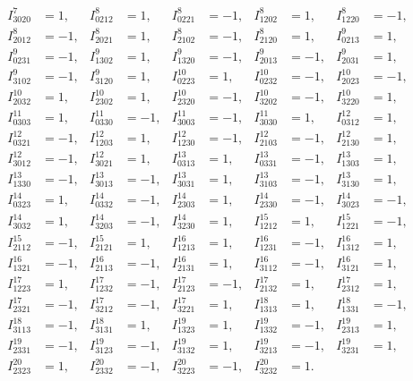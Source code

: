 \documentclass[a4paper,12pt, DIV=14, BCOR=5mm, twoside, headsepline]{scrbook}
\begin{document}
\begin{align}
\begin{alignedat}{5}
I^{7}_{3020} &= 1,   &  
I^{8}_{0212} &= 1,       &
I^{8}_{0221} &= -1,   &  
I^{8}_{1202} &= 1,   &  
I^{8}_{1220} &= -1,       \\
I^{8}_{2012} &= -1,   &  
I^{8}_{2021} &= 1,   &  
I^{8}_{2102} &= -1,       &
I^{8}_{2120} &= 1,   &  
I^{9}_{0213} &= 1,   \\  
I^{9}_{0231} &= -1,       &
I^{9}_{1302} &= 1,   &  
I^{9}_{1320} &= -1,   &  
I^{9}_{2013} &= -1,       &
I^{9}_{2031} &= 1,   \\  
I^{9}_{3102} &= -1,   &  
I^{9}_{3120} &= 1,       &
I^{10}_{0223} &= 1,   &  
I^{10}_{0232} &= -1,   &  
I^{10}_{2023} &= -1,       \\
I^{10}_{2032} &= 1,   &  
I^{10}_{2302} &= 1,   &  
I^{10}_{2320} &= -1,       &
I^{10}_{3202} &= -1,   &  
I^{10}_{3220} &= 1,   \\  
I^{11}_{0303} &= 1,       &
I^{11}_{0330} &= -1,   &  
I^{11}_{3003} &= -1,   &  
I^{11}_{3030} &= 1,       &
I^{12}_{0312} &= 1,   \\  
I^{12}_{0321} &= -1,   &  
I^{12}_{1203} &= 1,       &
I^{12}_{1230} &= -1,   &  
I^{12}_{2103} &= -1,   &  
I^{12}_{2130} &= 1,       \\
I^{12}_{3012} &= -1,   &  
I^{12}_{3021} &= 1,   &  
I^{13}_{0313} &= 1,       &
I^{13}_{0331} &= -1,   &  
I^{13}_{1303} &= 1,   \\  
I^{13}_{1330} &= -1,       &
I^{13}_{3013} &= -1,   &  
I^{13}_{3031} &= 1,   &  
I^{13}_{3103} &= -1,       &
I^{13}_{3130} &= 1,   \\  
I^{14}_{0323} &= 1,   &  
I^{14}_{0332} &= -1,       &
I^{14}_{2303} &= 1,   &  
I^{14}_{2330} &= -1,   &  
I^{14}_{3023} &= -1,       \\
I^{14}_{3032} &= 1,   &  
I^{14}_{3203} &= -1,   &  
I^{14}_{3230} &= 1,       &
I^{15}_{1212} &= 1,   &  
I^{15}_{1221} &= -1,   \\  
I^{15}_{2112} &= -1,       &
I^{15}_{2121} &= 1,   &  
I^{16}_{1213} &= 1,   &  
I^{16}_{1231} &= -1,       &
I^{16}_{1312} &= 1,   \\  
I^{16}_{1321} &= -1,   &  
I^{16}_{2113} &= -1,       &
I^{16}_{2131} &= 1,   &  
I^{16}_{3112} &= -1,   &  
I^{16}_{3121} &= 1,       \\
I^{17}_{1223} &= 1,   &  
I^{17}_{1232} &= -1,   &  
I^{17}_{2123} &= -1,       &
I^{17}_{2132} &= 1,   &  
I^{17}_{2312} &= 1,   \\  
I^{17}_{2321} &= -1,       &
I^{17}_{3212} &= -1,   &  
I^{17}_{3221} &= 1,   &  
I^{18}_{1313} &= 1,       &
I^{18}_{1331} &= -1,   \\  
I^{18}_{3113} &= -1,   &  
I^{18}_{3131} &= 1,       &
I^{19}_{1323} &= 1,   &  
I^{19}_{1332} &= -1,   &  
I^{19}_{2313} &= 1,       \\
I^{19}_{2331} &= -1,   &  
I^{19}_{3123} &= -1,   &  
I^{19}_{3132} &= 1,       &
I^{19}_{3213} &= -1,   &  
I^{19}_{3231} &= 1,   \\  
I^{20}_{2323} &= 1,       &
I^{20}_{2332} &= -1,   &  
I^{20}_{3223} &= -1,   &  
I^{20}_{3232} &= 1.   &  
    \end{alignedat}
\end{align}
\end{document}
